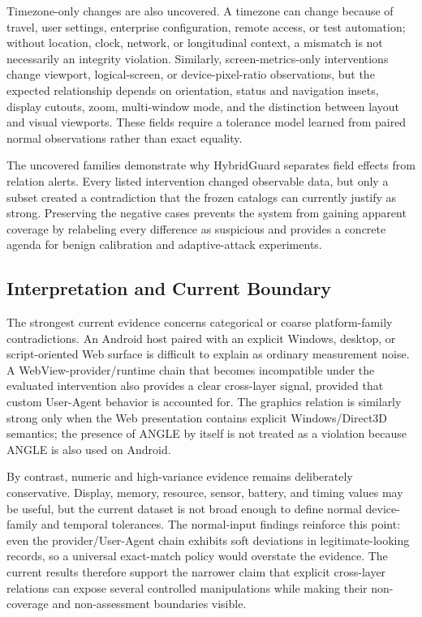 Timezone-only changes are also uncovered. A timezone can change because of travel, user settings, enterprise configuration, remote access, or test automation; without location, clock, network, or longitudinal context, a mismatch is not necessarily an integrity violation. Similarly, screen-metrics-only interventions change viewport, logical-screen, or device-pixel-ratio observations, but the expected relationship depends on orientation, status and navigation insets, display cutouts, zoom, multi-window mode, and the distinction between layout and visual viewports. These fields require a tolerance model learned from paired normal observations rather than exact equality.

The uncovered families demonstrate why HybridGuard separates field effects from relation alerts. Every listed intervention changed observable data, but only a subset created a contradiction that the frozen catalogs can currently justify as strong. Preserving the negative cases prevents the system from gaining apparent coverage by relabeling every difference as suspicious and provides a concrete agenda for benign calibration and adaptive-attack experiments.

\subsection{Interpretation and Current Boundary}

The strongest current evidence concerns categorical or coarse platform-family contradictions. An Android host paired with an explicit Windows, desktop, or script-oriented Web surface is difficult to explain as ordinary measurement noise. A WebView-provider/runtime chain that becomes incompatible under the evaluated intervention also provides a clear cross-layer signal, provided that custom User-Agent behavior is accounted for. The graphics relation is similarly strong only when the Web presentation contains explicit Windows/Direct3D semantics; the presence of ANGLE by itself is not treated as a violation because ANGLE is also used on Android.

By contrast, numeric and high-variance evidence remains deliberately conservative. Display, memory, resource, sensor, battery, and timing values may be useful, but the current dataset is not broad enough to define normal device-family and temporal tolerances. The normal-input findings reinforce this point: even the provider/User-Agent chain exhibits soft deviations in legitimate-looking records, so a universal exact-match policy would overstate the evidence. The current results therefore support the narrower claim that explicit cross-layer relations can expose several controlled manipulations while making their non-coverage and non-assessment boundaries visible.
